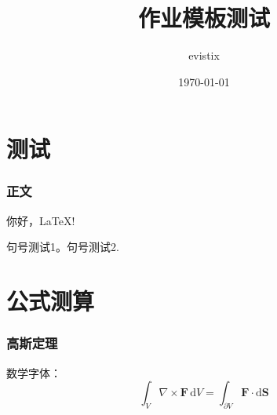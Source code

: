 \documentclass[theme = fancy, zihao = 5]{work-template}
\title{作业模板测试}
\author{evistix}
\date{\today}
\begin{document}
\maketitle

\part{测试}
\section{正文}
你好，\LaTeX!\par
句号测试1。句号测试2.
\part{公式测算}
\section{高斯定理}

数学字体：
\begin{equation}
    \int_V \nabla\times \symbf F\,\mathrm{d}V = \int_{\partial V} \symbf F\cdot\mathrm{d}\symbf S 
\end{equation}
\end{document}
